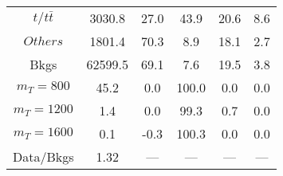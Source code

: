 \begin{figure}
\begin{minipage}[c]{0.32\textwidth}
{\begin{tabular}{cccccc}
$ t/t\bar{t} $ &  3030.8 &  27.0 &  43.9 &  20.6 &  8.6\\
$ Others $ &  1801.4 &  70.3 &  8.9 &  18.1 &  2.7\\
Bkgs &  62599.5 &  69.1 &  7.6 &  19.5 &  3.8\\
$ m_{T} = 800 $ &  45.2 &  0.0 &  100.0 &  0.0 &  0.0\\
$ m_{T} = 1200 $ &  1.4 &  0.0 &  99.3 &  0.7 &  0.0\\
$ m_{T} = 1600 $ &  0.1 &  -0.3 &  100.3 &  0.0 &  0.0\\
Data/Bkgs &  1.32 &  --- &  --- &  --- &  ---\\
\hline
\end{tabular}
}
\end{minipage}
\end{figure}

